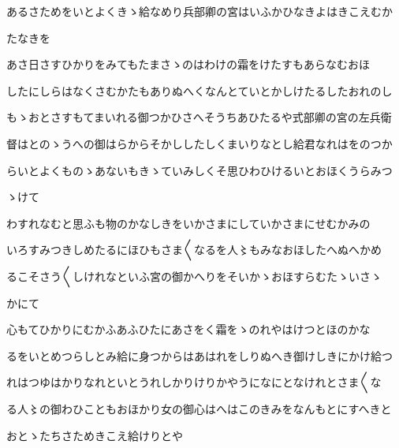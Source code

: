 \documentclass[a4paper,11pt,landscape]{ltjtarticle}
\begin{document}
あるさためをいとよくきゝ給なめり兵部卿の宮はいふかひなきよはきこえむか
\par\medskip
たなきを
\par\medskip
あさ日さすひかりをみてもたまさゝのはわけの霜をけたすもあらなむおほ
\par\medskip
したにしらはなくさむかたもありぬへくなんとていとかしけたるしたおれのし
\par\medskip
もゝおとさすもてまいれる御つかひさへそうちあひたるや式部卿の宮の左兵衛
\par\medskip
督はとのゝうへの御はらからそかししたしくまいりなとし給君なれはをのつか
\par\medskip
らいとよくものゝあないもきゝていみしくそ思ひわひけるいとおほくうらみつ
\par\medskip
ゝけて
\par\medskip
わすれなむと思ふも物のかなしきをいかさまにしていかさまにせむかみの
\par\medskip
いろすみつきしめたるにほひもさま〱なるを人〻もみなおほしたへぬへかめ
\par\medskip
るこそさう〱しけれなといふ宮の御かへりをそいかゝおほすらむたゝいさゝ
\par\medskip
かにて
\par\medskip
心もてひかりにむかふあふひたにあさをく霜をゝのれやはけつとほのかな
\par\medskip
るをいとめつらしとみ給に身つからはあはれをしりぬへき御けしきにかけ給つ
\par\medskip
れはつゆはかりなれといとうれしかりけりかやうになにとなけれとさま〱な
\par\medskip
る人〻の御わひこともおほかり女の御心はへはこのきみをなんもとにすへきと
\par\medskip
おとゝたちさためきこえ給けりとや
\par\medskip
\end{document}
